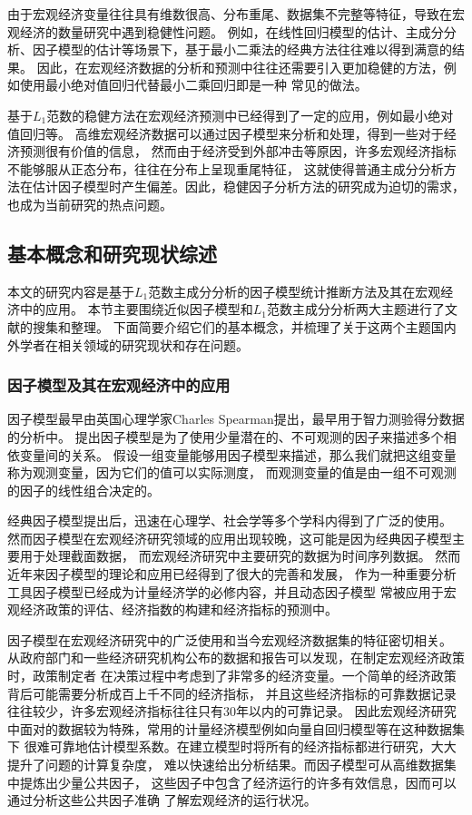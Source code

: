 由于宏观经济变量往往具有维数很高、分布重尾、数据集不完整等特征，导致在宏观经济的数量研究中遇到稳健性问题。
例如，在线性回归模型的估计、主成分分析、因子模型的估计等场景下，基于最小二乘法的经典方法往往难以得到满意的结果。
因此，在宏观经济数据的分析和预测中往往还需要引入更加稳健的方法，例如使用最小绝对值回归代替最小二乘回归即是一种
常见的做法。

基于$L_1$范数的稳健方法在宏观经济预测中已经得到了一定的应用，例如最小绝对值回归等。
高维宏观经济数据可以通过因子模型来分析和处理，得到一些对于经济预测很有价值的信息，
然而由于经济受到外部冲击等原因，许多宏观经济指标不能够服从正态分布，往往在分布上呈现重尾特征，
这就使得普通主成分分析方法在估计因子模型时产生偏差。因此，稳健因子分析方法的研究成为迫切的需求，
也成为当前研究的热点问题。

\subsection{基本概念和研究现状综述}
本文的研究内容是基于$L_1$范数主成分分析的因子模型统计推断方法及其在宏观经济中的应用。
本节主要围绕近似因子模型和$L_1$范数主成分分析两大主题进行了文献的搜集和整理。
下面简要介绍它们的基本概念，并梳理了关于这两个主题国内外学者在相关领域的研究现状和存在问题。

\subsubsection{因子模型及其在宏观经济中的应用}
因子模型最早由英国心理学家Charles Spearman提出，最早用于智力测验得分数据的分析中。
提出因子模型是为了使用少量潜在的、不可观测的因子来描述多个相依变量间的关系。
假设一组变量能够用因子模型来描述，那么我们就把这组变量称为观测变量，因为它们的值可以实际测度，
而观测变量的值是由一组不可观测的因子的线性组合决定的。

经典因子模型提出后，迅速在心理学、社会学等多个学科内得到了广泛的使用。
然而因子模型在宏观经济研究领域的应用出现较晚，这可能是因为经典因子模型主要用于处理截面数据，
而宏观经济研究中主要研究的数据为时间序列数据。
然而近年来因子模型的理论和应用已经得到了很大的完善和发展，
作为一种重要分析工具因子模型已经成为计量经济学的必修内容，并且动态因子模型
常被应用于宏观经济政策的评估、经济指数的构建和经济指标的预测中。

因子模型在宏观经济研究中的广泛使用和当今宏观经济数据集的特征密切相关。
从政府部门和一些经济研究机构公布的数据和报告可以发现，在制定宏观经济政策时，政策制定者
在决策过程中考虑到了非常多的经济变量。一个简单的经济政策背后可能需要分析成百上千不同的经济指标，
并且这些经济指标的可靠数据记录往往较少，许多宏观经济指标往往只有30年以内的可靠记录。
因此宏观经济研究中面对的数据较为特殊，常用的计量经济模型例如向量自回归模型等在这种数据集下
很难可靠地估计模型系数。在建立模型时将所有的经济指标都进行研究，大大提升了问题的计算复杂度，
难以快速给出分析结果。而因子模型可从高维数据集中提炼出少量公共因子，
这些因子中包含了经济运行的许多有效信息，因而可以通过分析这些公共因子准确
了解宏观经济的运行状况。

